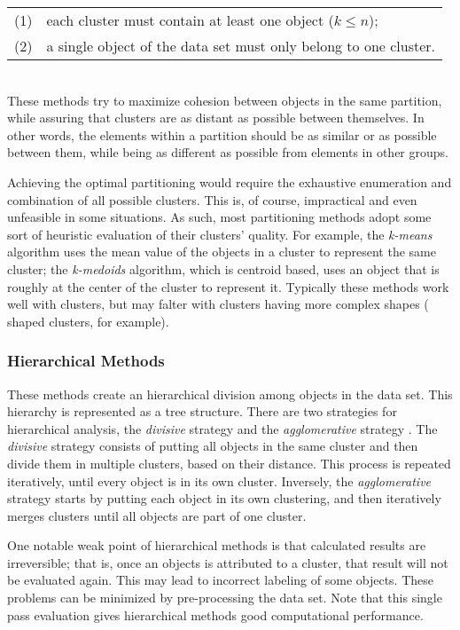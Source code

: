 \begin{tabular}{l l}
  (1) & each cluster must contain at least one object ($k \leq n$);\\
  (2) & a single object of the data set must only belong to one cluster.\\
\end{tabular}\\

These methods try to maximize cohesion between objects in the same partition,
while assuring that clusters are as distant as possible between themselves. In
other words, the elements within a partition should be as similar or 
as possible between them, while being as different as possible from elements in
other groups.

Achieving the optimal partitioning would require the exhaustive enumeration and
combination of all possible clusters. This is, of course, impractical and even
unfeasible in some situations. As such, most partitioning methods adopt some
sort of heuristic evaluation of their clusters' quality. For example, the
\emph{k-means} algorithm uses the mean value of the objects in a cluster to
represent the same cluster; the \emph{k-medoids} algorithm, which is
centroid based, uses an object that is roughly at the center of the cluster to
represent it. Typically these methods work well with  clusters,
but may falter with clusters having more complex shapes ( shaped
clusters, for example).

\subsubsection*{Hierarchical Methods}

These methods create an hierarchical division among objects in the data set.
This hierarchy is represented as a tree structure. There are two strategies for
hierarchical analysis, the \emph{divisive} strategy and the \emph{agglomerative}
strategy \cite{han2006data}. The \emph{divisive} strategy consists of putting
all objects in the same cluster and then divide them in multiple clusters, based
on their distance. This process is repeated iteratively, until every object is
in its own cluster. Inversely, the \emph{agglomerative} strategy starts by
putting each object in its own clustering, and then iteratively merges clusters
until all objects are part of one cluster.

One notable weak point of hierarchical methods is that calculated results are
irreversible; that is, once an objects is attributed to a cluster, that result
will not be evaluated again. This may lead to incorrect labeling of some
objects. These problems can be minimized by pre-processing the data set. Note
that this single pass evaluation gives hierarchical methods good computational
performance.

